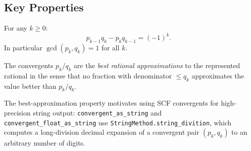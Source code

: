 \subsection{Key Properties}

\begin{proposition}
  For any $k \geq 0$:
  \[
    p_{k-1} q_k - p_k q_{k-1} = (-1)^k.
  \]
  In particular $\gcd(p_k, q_k) = 1$ for all $k$.
\end{proposition}

\begin{proposition}
  The convergents $p_k/q_k$ are the \emph{best rational approximations} to the
  represented rational in the sense that no fraction with denominator $\leq q_k$
  approximates the value better than $p_k/q_k$.
\end{proposition}

\begin{remark}
  The best-approximation property motivates using SCF convergents for high-precision
  string output: \texttt{convergent\_as\_string} and \texttt{convergent\_float\_as\_string}
  use \texttt{StringMethod.string\_divition}, which computes a long-division decimal
  expansion of a convergent pair $(p_k, q_k)$ to an arbitrary number of digits.
\end{remark}